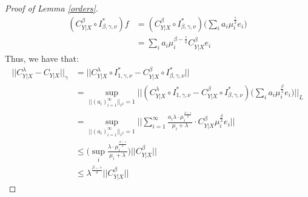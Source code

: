 \documentclass[accepted]{article}
\theoremstyle{definition}
\begin{document}
\begin{proof}[Proof of Lemma \ref{orders}]
\begin{align*}
    (C^{\beta}_{Y|X} \circ I^{*}_{\beta, \gamma, \nu})f & = (C^{\beta}_{Y|X} \circ I^{*}_{\beta, \gamma, \nu})\Big(\sum_{i} a_i \mu^{\frac{\gamma}{2}}_i e_i\Big) \\
    & = \sum_{i} a_i \mu^{\beta - \frac{\gamma}{2}}_i C^{\beta}_{Y|X}e_i
\end{align*}
Thus, we have that:
\begin{align*}
    ||C^{\lambda}_{Y|X} - C_{Y|X}||_{\gamma} & =||C^{\lambda}_{Y|X} \circ I^{*}_{1, \gamma, \nu} - C^{\beta}_{Y|X} \circ I^{*}_{\beta, \gamma, \nu}||  \\
    & = \sup_{||(a_i)_{i = 1}^{\infty}||_{\ell^2} = 1} ||(C^{\lambda}_{Y|X} \circ I^{*}_{1, \gamma, \nu} - C^{\beta}_{Y|X} \circ I^{*}_{\beta, \gamma, \nu}) \Big(\sum_{i} a_i \mu^{\frac{\beta}{2}}_i e_i\Big)||_{L} \\
    & = \sup_{||(a_i)_{i = 1}^{\infty}||_{\ell^2} = 1} \Big|\Big|\sum_{i = 1}^{\infty} \frac{a_i\lambda \cdot \mu^{\frac{\beta - \gamma}{2}}_i}{\mu_i + \lambda} \cdot C^{\beta}_{Y|X} \mu^{\frac{\beta}{2}}_i e_i \Big|\Big| \\
    & \leq  \Big(\sup_i \frac{\lambda \cdot \mu^{\frac{\beta - \gamma}{2}}_i}{\mu_i + \lambda}\Big) ||C^{\beta}_{Y|X}|| \\
    & \leq \lambda^{\frac{\beta - \gamma}{2}}||C^{\beta}_{Y|X}||
\end{align*}
\end{proof}
\end{document}
